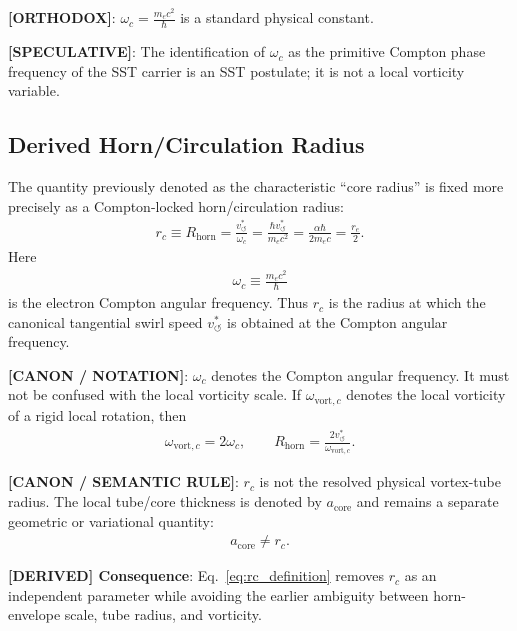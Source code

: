 \documentclass[11pt]{article}
\theoremstyle{definition}
\theoremstyle{plain}
\theoremstyle{remark}
\newcommand{\rc}{{r_c}}
\newcommand{\vchar}{v_{\!\boldsymbol{\circlearrowleft}}^{\ast}}
\begin{document}
        \textbf{[ORTHODOX]}: $\omega_c = \frac{m_e c^2}{\hbar}$ is a standard physical constant.
        
        \textbf{[SPECULATIVE]}: The identification of $\omega_c$ as the primitive Compton phase frequency of the SST carrier is an SST postulate; it is not a local vorticity variable.
    
    \subsection{Derived Horn/Circulation Radius}
        \label{subsec:derived_horn_circulation_radius}

        The quantity previously denoted as the characteristic ``core radius'' is fixed more precisely as a
        Compton-locked horn/circulation radius:
        \begin{align}
            \rc \equiv R_{\mathrm{horn}}
            = \frac{\vchar}{\omega_c}
            = \frac{\hbar\vchar}{m_e c^2}
            = \frac{\alpha\hbar}{2m_e c}
            = \frac{r_e}{2}.
            \label{eq:rc_definition}
        \end{align}
        Here
        \begin{align}
            \omega_c \equiv \frac{m_e c^2}{\hbar}
            \label{eq:omega_c_compton}
        \end{align}
        is the electron Compton angular frequency. Thus $\rc$ is the radius at which the canonical
        tangential swirl speed $\vchar$ is obtained at the Compton angular frequency.

        \textbf{[CANON / NOTATION]}: $\omega_c$ denotes the Compton angular frequency. It must not be confused with the local vorticity scale. If $\omega_{\mathrm{vort},c}$ denotes the local vorticity of a rigid local rotation, then
        \begin{align}
            \omega_{\mathrm{vort},c}=2\omega_c,
            \qquad
            R_{\mathrm{horn}}=\frac{2\vchar}{\omega_{\mathrm{vort},c}}.
        \end{align}

        \textbf{[CANON / SEMANTIC RULE]}: $\rc$ is not the resolved physical vortex-tube radius. The local tube/core thickness is denoted by $a_{\mathrm{core}}$ and remains a separate geometric or variational quantity:
        \begin{align}
            a_{\mathrm{core}} \neq \rc.
        \end{align}

        \textbf{[DERIVED] Consequence}: Eq.~\eqref{eq:rc_definition} removes $\rc$ as an independent parameter while avoiding the earlier ambiguity between horn-envelope scale, tube radius, and vorticity.
\end{document}
